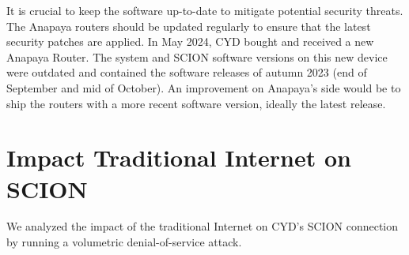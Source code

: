 It is crucial to keep the software up-to-date to mitigate potential security threats.
The Anapaya routers should be updated regularly to ensure that the latest security patches are applied.
In May 2024, CYD bought and received a new Anapaya Router.
The system and SCION software versions on this new device were outdated and contained the software releases of autumn 2023 (end of September and mid of October).
An improvement on Anapaya's side would be to ship the routers with a more recent software version, ideally the latest release.




\section{Impact Traditional Internet on SCION}
\label{sec:impact-traditional-internet}
We analyzed the impact of the traditional Internet on CYD's SCION connection by running a volumetric denial-of-service attack.


